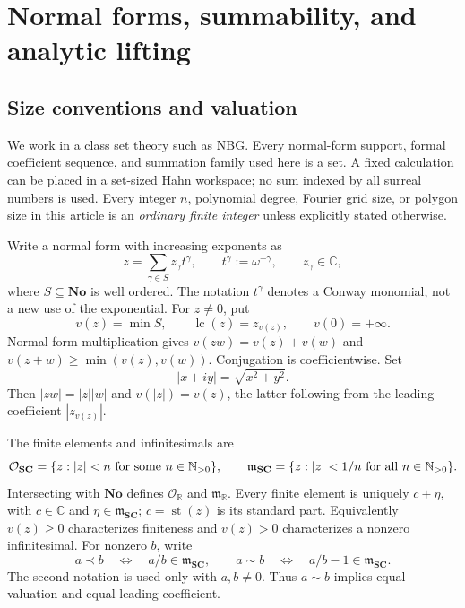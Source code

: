 \documentclass[11pt,letterpaper]{article}
\theoremstyle{definition}
\theoremstyle{remark}
\newcommand{\No}{\mathbf{No}}
\newcommand{\SC}{\mathbf{SC}}
\newcommand{\R}{\mathbb R}\newcommand{\C}{\mathbb C}
\newcommand{\OO}{\mathcal O}\newcommand{\mm}{\mathfrak m}
\newcommand{\st}{\operatorname{st}}
\newcommand{\lc}{\operatorname{lc}}
\numberwithin{equation}{section}
\begin{document}
\section{Normal forms, summability, and analytic lifting}\label{sec:foundations}
\subsection{Size conventions and valuation}
We work in a class set theory such as NBG. Every normal-form support, formal coefficient sequence, and summation family used here is a set. A fixed calculation can be placed in a set-sized Hahn workspace; no sum indexed by all surreal numbers is used. Every integer $n$, polynomial degree, Fourier grid size, or polygon size in this article is an \emph{ordinary finite integer} unless explicitly stated otherwise.

Write a normal form with increasing exponents as
\[
 z=\sum_{\gamma\in S}z_\gamma t^\gamma,
 \qquad t^\gamma:=\omega^{-\gamma},\qquad z_\gamma\in\C,
\]
where $S\subseteq\No$ is well ordered. The notation $t^\gamma$ denotes a Conway monomial, not a new use of the exponential. For $z\ne0$, put
\[
 v(z)=\min S,\qquad \lc(z)=z_{v(z)},\qquad v(0)=+\infty.
\]
Normal-form multiplication gives $v(zw)=v(z)+v(w)$ and $v(z+w)\ge\min(v(z),v(w))$. Conjugation is coefficientwise. Set
\[
 |x+iy|=\sqrt{x^2+y^2}.
\]
Then $|zw|=|z||w|$ and $v(|z|)=v(z)$, the latter following from the leading coefficient $|z_{v(z)}|$.

The finite elements and infinitesimals are
\[
 \OO_{\SC}=\{z:|z|<n\text{ for some }n\in\N_{>0}\},\qquad
 \mm_{\SC}=\{z:|z|<1/n\text{ for all }n\in\N_{>0}\}.
\]
Intersecting with $\No$ defines $\OO_{\R}$ and $\mm_{\R}$. Every finite element is uniquely $c+\eta$, with $c\in\C$ and $\eta\in\mm_{\SC}$; $c=\st(z)$ is its standard part. Equivalently $v(z)\ge0$ characterizes finiteness and $v(z)>0$ characterizes a nonzero infinitesimal. For nonzero $b$, write
\[
 a\prec b\quad\Longleftrightarrow\quad a/b\in\mm_{\SC},
 \qquad
 a\sim b\quad\Longleftrightarrow\quad a/b-1\in\mm_{\SC}.
\]
The second notation is used only with $a,b\ne0$. Thus $a\sim b$ implies equal valuation and equal leading coefficient.
\end{document}
